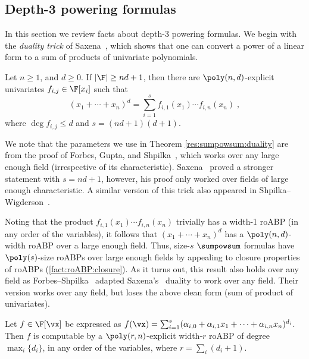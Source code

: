 \documentclass{toc}
\begin{document}
\subsection{Depth-3 powering formulas}

In this section we review facts about depth-3 powering formulas.  We begin with the \emph{duality trick} of Saxena~\cite{Saxena08}, which shows that one can convert a power of a linear form to a sum of products of univariate polynomials.

\begin{theoremwp}\label{res:sumpowsum:duality}
        Let $n\ge 1$, and $d\ge 0$. If $|\F|\ge nd+1$, then there are $\poly(n,d)$-explicit univariates $f_{i,j}\in\F[x_i]$ such that
        \[
                (x_1+\cdots+x_n)^d=\sum_{i=1}^s f_{i,1}(x_1)\cdots f_{i,n}(x_n)
                \;,
        \]
        where $\deg f_{i,j}\le d$ and $s=(nd+1)(d+1)$.
\end{theoremwp}

We note that the parameters we use in Theorem \ref{res:sumpowsum:duality}  are from the proof of Forbes, Gupta, and Shpilka~\cite{ForbesGS13}, which works over any large enough field (irrespective of its characteristic). Saxena~\cite{Saxena08} proved a stronger statement with  $s=nd+1$, however, his proof  only worked over fields of large enough characteristic. A similar version of this trick also appeared in Shpilka--Wigderson~\cite{ShpilkaWigderson01}.

Noting that the product $f_{i,1}(x_1)\cdots f_{i,n}(x_n)$ trivially has a width-1 roABP (in any order of the variables), it follows that $(x_1+\cdots+x_n)^d$ has a $\poly(n,d)$-width roABP over a large enough field.  Thus, size-$s$ $\sumpowsum$ formulas have $\poly(s)$-size roABPs over large enough fields by appealing to closure properties of roABPs (\autoref{fact:roABP:closure}).  As it turns out, this result also holds over any field as Forbes--Shpilka~\cite{ForbesShpilka13b} adapted Saxena's~\cite{Saxena08} duality to work over any field.  Their version works over any field, but loses the above clean form (sum of product of univariates).

\begin{theoremwp}\label{res:sumpowsum:roABP}
        Let $f\in\F[\vx]$ be expressed as $f(\vx)=\sum_{i=1}^s (\alpha_{i,0}+\alpha_{i,1}x_1+\cdots+\alpha_{i,n}x_n)^{d_i}$.  Then $f$ is computable by a $\poly(r,n)$-explicit width-$r$ roABP of degree $\max_i\{d_i\}$, in any order of the variables, where $r=\sum_i (d_i+1)$.
\end{theoremwp}
\end{document}
